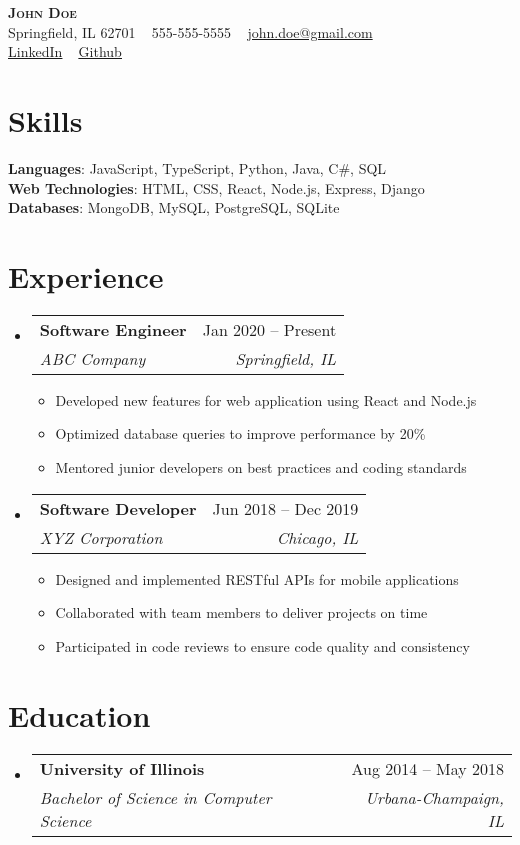 \documentclass[letterpaper,11pt]{article}
\makeatletter
\newcommand{\resumeItem}[1]{
  \item\small{
    {#1 \vspace{-2pt}}
  }
}
\newcommand{\resumeSubheading}[4]{
  \vspace{-2pt}\item
    \begin{tabular*}{0.97\textwidth}[t]{l@{\extracolsep{\fill}}r}
      \textbf{#1} & #2 \\
      \textit{\small#3} & \textit{\small #4} \\
    \end{tabular*}\vspace{-7pt}
}
\newcommand{\resumeSubHeadingListStart}{\begin{itemize}[leftmargin=0.15in, label={}]}
\newcommand{\resumeSubHeadingListEnd}{\end{itemize}}
\newcommand{\resumeItemListStart}{\begin{itemize}}
\newcommand{\resumeItemListEnd}{\end{itemize}\vspace{-5pt}}
\makeatother
\begin{document}
\begin{center}
  \textbf{\Huge \scshape John Doe} \\ \vspace{1pt}
  \small Springfield, IL 62701 ~ 
\small 555-555-5555 ~ 
\href{mailto:john.doe@gmail.com}{john.doe@gmail.com} \\ 
\href{https://www.linkedin.com/in/johndoe}{\underline{LinkedIn}} ~ 
\href{https://github.com/johndoe}{\underline{Github}}
\end{center}

\section{Skills}
  \begin{itemize}[leftmargin=0.15in, label={}]
    \small{\item{
      \textbf{Languages}{: JavaScript, TypeScript, Python, Java, C\#, SQL} \\ 
			\textbf{Web Technologies}{: HTML, CSS, React, Node.js, Express, Django} \\ 
			\textbf{Databases}{: MongoDB, MySQL, PostgreSQL, SQLite}
    }}
  \end{itemize}

\section{Experience}
  \resumeSubHeadingListStart
    \resumeSubheading
      {Software Engineer}{Jan 2020 -- Present}
      {ABC Company}{Springfield, IL}
    \resumeItemListStart
      \resumeItem{Developed new features for web application using React and Node.js}
			\resumeItem{Optimized database queries to improve performance by 20\%}
			\resumeItem{Mentored junior developers on best practices and coding standards}
    \resumeItemListEnd
		\resumeSubheading
      {Software Developer}{Jun 2018 -- Dec 2019}
      {XYZ Corporation}{Chicago, IL}
    \resumeItemListStart
      \resumeItem{Designed and implemented RESTful APIs for mobile applications}
			\resumeItem{Collaborated with team members to deliver projects on time}
			\resumeItem{Participated in code reviews to ensure code quality and consistency}
    \resumeItemListEnd
  \resumeSubHeadingListEnd

\section{Education}
  \resumeSubHeadingListStart
    \resumeSubheading
      {University of Illinois}{Aug 2014 -- May 2018}
      {Bachelor of Science in Computer Science}{Urbana-Champaign, IL}
  \resumeSubHeadingListEnd
\end{document}
